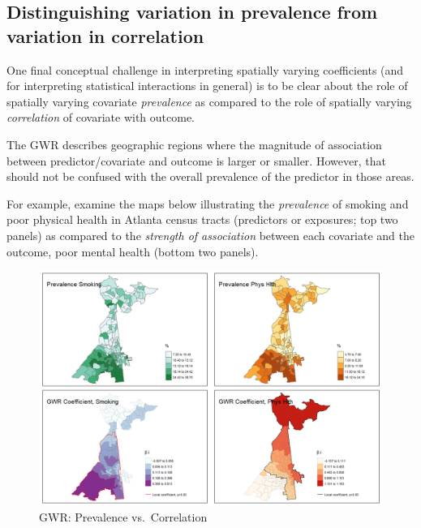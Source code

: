 \documentclass[
]{book}
\begin{document}
\hypertarget{distinguishing-variation-in-prevalence-from-variation-in-correlation}{%
\subsection{\texorpdfstring{Distinguishing variation in \textbf{prevalence} from variation in \textbf{correlation}}{Distinguishing variation in prevalence from variation in correlation}}\label{distinguishing-variation-in-prevalence-from-variation-in-correlation}}

One final conceptual challenge in interpreting spatially varying coefficients (and for interpreting statistical interactions in general) is to be clear about the role of spatially varying covariate \emph{prevalence} as compared to the role of spatially varying \emph{correlation} of covariate with outcome.

The GWR describes geographic regions where the magnitude of association between predictor/covariate and outcome is larger or smaller. However, that should not be confused with the overall prevalence of the predictor in those areas.

For example, examine the maps below illustrating the \emph{prevalence} of smoking and poor physical health in Atlanta census tracts (predictors or exposures; top two panels) as compared to the \emph{strength of association} between each covariate and the outcome, poor mental health (bottom two panels).

\begin{figure}
\centering
\includegraphics{images/gwr-prevalence.png}
\caption{\label{fig:unnamed-chunk-3}GWR: Prevalence vs.~Correlation}
\end{figure}
\end{document}

